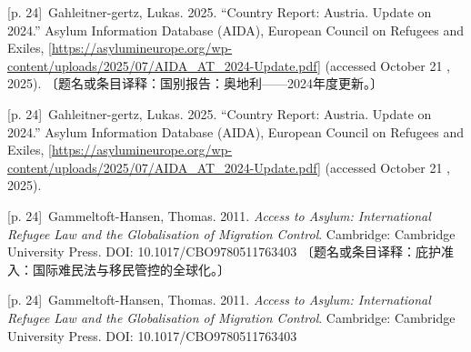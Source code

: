 \documentclass[10pt,a4paper]{article}
\begin{document}
\noindent\begin{minipage}{\textwidth}\begin{minipage}[t]{\dimexpr.5\textwidth-4mm\relax}{\scriptsize\color{gray} [p. 24]}\ Gahleitner-gertz, Lukas. 2025. “Country Report: Austria. Update on 2024.” Asylum Information Database (AIDA), European Council on Refugees and Exiles, [\url{https://asylumineurope.org/wp-content/uploads/2025/07/AIDA_AT_2024-Update.pdf]} (accessed October 21 , 2025). 〔题名或条目译释：国别报告：奥地利——2024年度更新。〕\par\end{minipage}\hfill\begin{minipage}[t]{\dimexpr.5\textwidth-4mm\relax}{\scriptsize\color{gray} [p. 24]}\ Gahleitner-gertz, Lukas. 2025. “Country Report: Austria. Update on 2024.” Asylum Information Database (AIDA), European Council on Refugees and Exiles, [\url{https://asylumineurope.org/wp-content/uploads/2025/07/AIDA_AT_2024-Update.pdf]} (accessed October 21 , 2025).\par\end{minipage}\end{minipage}\par
\noindent\begin{minipage}{\textwidth}\begin{minipage}[t]{\dimexpr.5\textwidth-4mm\relax}{\scriptsize\color{gray} [p. 24]}\ Gammeltoft-Hansen, Thomas. 2011. \textit{Access to Asylum: International Refugee Law and the Globalisation of Migration Control}. Cambridge: Cambridge University Press. DOI: 10.1017/CBO9780511763403 〔题名或条目译释：庇护准入：国际难民法与移民管控的全球化。〕\par\end{minipage}\hfill\begin{minipage}[t]{\dimexpr.5\textwidth-4mm\relax}{\scriptsize\color{gray} [p. 24]}\ Gammeltoft-Hansen, Thomas. 2011. \textit{Access to Asylum: International Refugee Law and the Globalisation of Migration Control}. Cambridge: Cambridge University Press. DOI: 10.1017/CBO9780511763403\par\end{minipage}\end{minipage}\par
\end{document}
